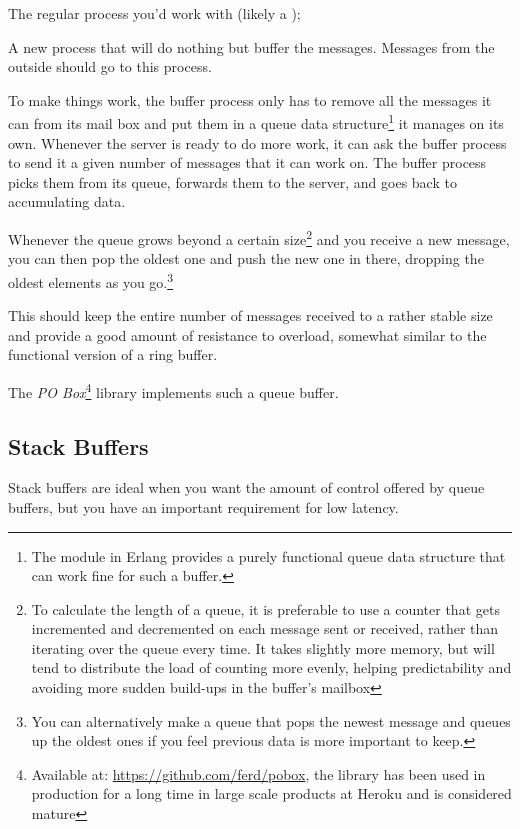 \documentclass[11pt, oneside]{book}   	%
\begin{document}
\begin{itemize*}
	\item The regular process you'd work with (likely a );
	\item A new process that will do nothing but buffer the messages. Messages from the outside should go to this process.
\end{itemize*}

To make things work, the buffer process only has to remove all the messages it can from its mail box and put them in a queue data structure\footnote{The  module in Erlang provides a purely functional queue data structure that can work fine for such a buffer.} it manages on its own. Whenever the server is ready to do more work, it can ask the buffer process to send it a given number of messages that it can work on. The buffer process picks them from its queue, forwards them to the server, and goes back to accumulating data.

Whenever the queue grows beyond a certain size\footnote{To calculate the length of a queue, it is preferable to use a counter that gets incremented and decremented on each message sent or received, rather than iterating over the queue every time. It takes slightly more memory, but will tend to distribute the load of counting more evenly, helping predictability and avoiding more sudden build-ups in the buffer's mailbox} and you receive a new message, you can then pop the oldest one and push the new one in there, dropping the oldest elements as you go.\footnote{You can alternatively make a queue that pops the newest message and queues up the oldest ones if you feel previous data is more important to keep.}

This should keep the entire number of messages received to a rather stable size and provide a good amount of resistance to overload, somewhat similar to the functional version of a ring buffer.

The \emph{PO Box}\footnote{Available at: \href{https://github.com/ferd/pobox}{https://github.com/ferd/pobox}, the library has been used in production for a long time in large scale products at Heroku and is considered mature} library implements such a queue buffer.

\subsection{Stack Buffers}

Stack buffers are ideal when you want the amount of control offered by queue buffers, but you have an important requirement for low latency.
\end{document}
